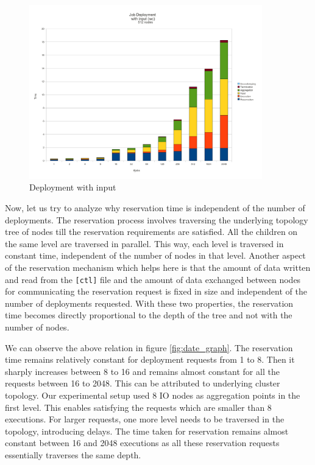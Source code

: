 \begin{figure}
  \begin{center}
    \leavevmode
      \includegraphics[height=0.4\textheight,width=0.9\textwidth]
		{./img/wc_graph}
    \caption{Deployment with input}
    \label{fig:wc_graph}
  \end{center}
\end{figure}

Now, let us try to analyze why reservation time is independent of the number of
deployments.  The reservation process involves traversing the underlying
topology tree of nodes till the reservation requirements are satisfied.  All the
children on the same level are traversed in parallel.  This way,
each level is traversed in constant time, independent of the number of nodes in
that level.  Another aspect of the reservation mechanism which helps here is
that the amount of data written and read from the \texttt{[ctl]} file and the
amount of data exchanged between nodes for communicating the reservation request is
fixed in size and independent of the number of deployments requested.  With
these two properties, the reservation time becomes directly proportional to the
depth of the tree and not with the number of nodes.

We can observe the above relation in figure \ref{fig:date_graph}. The 
reservation time remains relatively constant for deployment requests from 1 to
8.  Then it sharply increases between 8 to 16 and remains almost constant for
all the requests between 16 to 2048.  This can be attributed to underlying
cluster topology. 
Our experimental setup used 8 IO nodes as aggregation points in the first level. 
This enables satisfying the requests which are smaller
than 8 executions. For larger requests, one more level needs to be traversed
in the topology, introducing delays.  The time taken for reservation remains
almost constant between 16 and 2048 executions as all these reservation
requests essentially traverses the same depth.  

